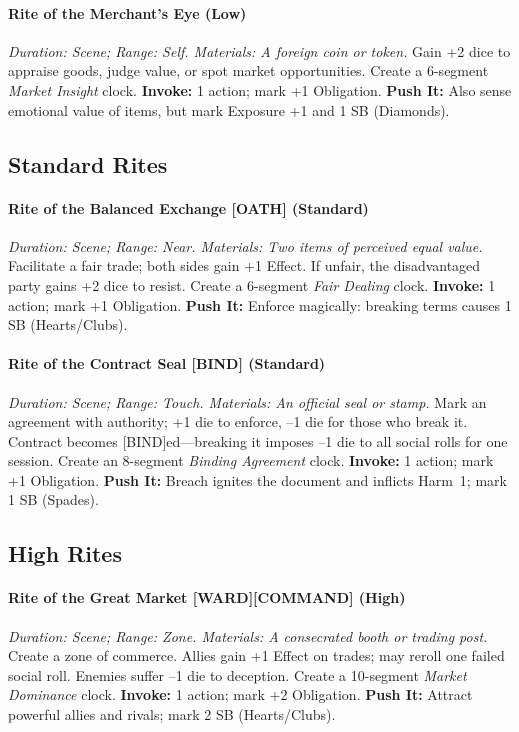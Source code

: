 \paragraph{Rite of the Merchant's Eye (Low)}  
\emph{Duration: Scene; Range: Self. Materials: A foreign coin or token.}  
Gain +2 dice to appraise goods, judge value, or spot market opportunities. Create a 6-segment \emph{Market Insight} clock.  
\textbf{Invoke:} 1 action; mark +1 Obligation.  
\textbf{Push It:} Also sense emotional value of items, but mark Exposure +1 and 1 SB (Diamonds).

\subsection*{Standard Rites}
\paragraph{Rite of the Balanced Exchange [OATH] (Standard)}  
\emph{Duration: Scene; Range: Near. Materials: Two items of perceived equal value.}  
Facilitate a fair trade; both sides gain +1 Effect. If unfair, the disadvantaged party gains +2 dice to resist. Create a 6-segment \emph{Fair Dealing} clock.  
\textbf{Invoke:} 1 action; mark +1 Obligation.  
\textbf{Push It:} Enforce magically: breaking terms causes 1 SB (Hearts/Clubs).

\paragraph{Rite of the Contract Seal [BIND] (Standard)}  
\emph{Duration: Scene; Range: Touch. Materials: An official seal or stamp.}  
Mark an agreement with authority; +1 die to enforce, --1 die for those who break it. Contract becomes [BIND]ed---breaking it imposes --1 die to all social rolls for one session. Create an 8-segment \emph{Binding Agreement} clock.  
\textbf{Invoke:} 1 action; mark +1 Obligation.  
\textbf{Push It:} Breach ignites the document and inflicts Harm~1; mark 1 SB (Spades).

\subsection*{High Rites}
\paragraph{Rite of the Great Market [WARD][COMMAND] (High)}  
\emph{Duration: Scene; Range: Zone. Materials: A consecrated booth or trading post.}  
Create a zone of commerce. Allies gain +1 Effect on trades; may reroll one failed social roll. Enemies suffer --1 die to deception. Create a 10-segment \emph{Market Dominance} clock.  
\textbf{Invoke:} 1 action; mark +2 Obligation.  
\textbf{Push It:} Attract powerful allies and rivals; mark 2 SB (Hearts/Clubs).


